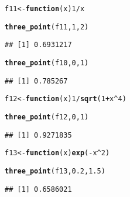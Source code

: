 \documentclass[11pt, a4paper]{article}\usepackage[]{graphicx}\usepackage[]{xcolor}
\makeatletter
\newcommand{\hlnum}[1]{\textcolor[rgb]{0.686,0.059,0.569}{#1}}%
\newcommand{\hlopt}[1]{\textcolor[rgb]{0,0,0}{#1}}%
\newcommand{\hldef}[1]{\textcolor[rgb]{0.345,0.345,0.345}{#1}}%
\newcommand{\hlkwa}[1]{\textcolor[rgb]{0.161,0.373,0.58}{\textbf{#1}}}%
\newcommand{\hlkwb}[1]{\textcolor[rgb]{0.69,0.353,0.396}{#1}}%
\newcommand{\hlkwc}[1]{\textcolor[rgb]{0.333,0.667,0.333}{#1}}%
\newcommand{\hlkwd}[1]{\textcolor[rgb]{0.737,0.353,0.396}{\textbf{#1}}}%
\newenvironment{kframe}{%
 \def\at@end@of@kframe{}%
 \ifinner\ifhmode%
  \def\at@end@of@kframe{\end{minipage}}%
  \begin{minipage}{\columnwidth}%
 \fi\fi%
 \def\FrameCommand##1{\hskip\@totalleftmargin \hskip-\fboxsep
 \colorbox{shadecolor}{##1}\hskip-\fboxsep
     \hskip-\linewidth \hskip-\@totalleftmargin \hskip\columnwidth}%
 \MakeFramed {\advance\hsize-\width
   \@totalleftmargin\z@ \linewidth\hsize
   \@setminipage}}%
 {\par\unskip\endMakeFramed%
 \at@end@of@kframe}
\newenvironment{knitrout}{}{} %
\makeatother
\begin{document}
\begin{knitrout}
\color{fgcolor}\begin{kframe}
\begin{alltt}
\hldef{f11} \hlkwb{<-} \hlkwa{function}\hldef{(}\hlkwc{x}\hldef{)} \hlnum{1} \hlopt{/} \hldef{x}

\hlkwd{three_point}\hldef{(f11,} \hlnum{1}\hldef{,} \hlnum{2}\hldef{)}
\end{alltt}
\begin{verbatim}
## [1] 0.6931217
\end{verbatim}
\end{kframe}
\end{knitrout}

\begin{knitrout}
\color{fgcolor}\begin{kframe}
\begin{alltt}
\hlkwd{three_point}\hldef{(f10,} \hlnum{0}\hldef{,} \hlnum{1}\hldef{)}
\end{alltt}
\begin{verbatim}
## [1] 0.785267
\end{verbatim}
\end{kframe}
\end{knitrout}

\begin{knitrout}
\color{fgcolor}\begin{kframe}
\begin{alltt}
\hldef{f12} \hlkwb{<-} \hlkwa{function}\hldef{(}\hlkwc{x}\hldef{)} \hlnum{1} \hlopt{/} \hlkwd{sqrt}\hldef{(}\hlnum{1} \hlopt{+} \hldef{x}\hlopt{^}\hlnum{4}\hldef{)}

\hlkwd{three_point}\hldef{(f12,} \hlnum{0}\hldef{,} \hlnum{1}\hldef{)}
\end{alltt}
\begin{verbatim}
## [1] 0.9271835
\end{verbatim}
\end{kframe}
\end{knitrout}

\begin{knitrout}
\color{fgcolor}\begin{kframe}
\begin{alltt}
\hldef{f13} \hlkwb{<-} \hlkwa{function}\hldef{(}\hlkwc{x}\hldef{)} \hlkwd{exp}\hldef{(}\hlopt{-}\hldef{x}\hlopt{^}\hlnum{2}\hldef{)}

\hlkwd{three_point}\hldef{(f13,} \hlnum{0.2}\hldef{,} \hlnum{1.5}\hldef{)}
\end{alltt}
\begin{verbatim}
## [1] 0.6586021
\end{verbatim}
\end{kframe}
\end{knitrout}
\end{document}
